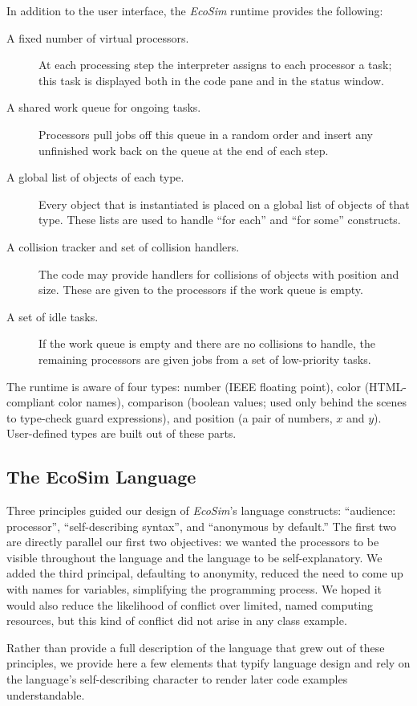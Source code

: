 \documentclass{sig-alternate}
\newcommand{\EcoSim}{\emph{EcoSim}}
\begin{document}
In addition to the user interface, the \EcoSim{} runtime provides the following:
\begin{description}
	\item[A fixed number of virtual processors.]
		At each processing step the interpreter assigns to each processor a task;
		this task is displayed both in the code pane and in the status window.
	\item[A shared work queue for ongoing tasks.]
		Processors pull jobs off this queue in a random order
		and insert any unfinished work back on the queue at the end of each step.
	\item[A global list of objects of each type.]
		Every object that is instantiated is placed on a global list of objects of that type.
		These lists are used to handle ``for each'' and ``for some'' constructs.
	\item[A collision tracker and set of collision handlers.]
		The code may provide handlers for collisions of objects with position and size.
		These are given to the processors if the work queue is empty.
	\item[A set of idle tasks.]
		If the work queue is empty and there are no collisions to handle,
		the remaining processors are given jobs from a set of low-priority tasks.
\end{description}

The runtime is aware of four types:
number (IEEE floating point), color (HTML-compliant color names), 
comparison (boolean values; used only behind the scenes to type-check guard expressions),
and position (a pair of numbers, $x$ and $y$).
User-defined types are built out of these parts.


\subsection{The EcoSim Language}
Three principles guided our design of \EcoSim{}'s language constructs:
``audience: processor'', ``self-describing syntax'', and ``anonymous by default.''
The first two are directly parallel our first two objectives:
we wanted the processors to be visible throughout the language
and the language to be self-explanatory.
We added the third principal, defaulting to anonymity,
reduced the need to come up with names for variables,
simplifying the programming process.
We hoped it would also reduce the likelihood of conflict over limited, named computing resources,
but this kind of conflict did not arise in any class example.

Rather than provide a full description of the language that grew out of these principles,
we provide here a few elements that typify language design
and rely on the language's self-describing character 
to render later code examples understandable.
\end{document}
